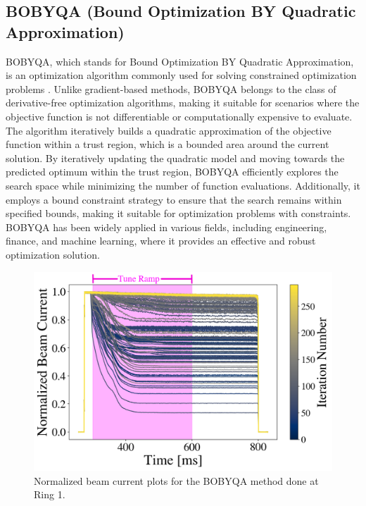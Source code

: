 \subsection{BOBYQA (Bound Optimization BY Quadratic Approximation)}

BOBYQA, which stands for Bound Optimization BY Quadratic Approximation, is an optimization algorithm commonly used for solving constrained optimization problems \cite{bobyqa}. Unlike gradient-based methods, BOBYQA belongs to the class of derivative-free optimization algorithms, making it suitable for scenarios where the objective function is not differentiable or computationally expensive to evaluate. The algorithm iteratively builds a quadratic approximation of the objective function within a trust region, which is a bounded area around the current solution. By iteratively updating the quadratic model and moving towards the predicted optimum within the trust region, BOBYQA efficiently explores the search space while minimizing the number of function evaluations. Additionally, it employs a bound constraint strategy to ensure that the search remains within specified bounds, making it suitable for optimization problems with constraints. BOBYQA has been widely applied in various fields, including engineering, finance, and machine learning, where it provides an effective and robust optimization solution.

\begin{figure}[H]
    \centering
    \includegraphics[width=\linewidth]{chapter5/i2_bobyqa_commented.png}
    \caption{Normalized beam current plots for the BOBYQA method done at Ring 1.}
    \label{fig:ibobyqa}
\end{figure}

